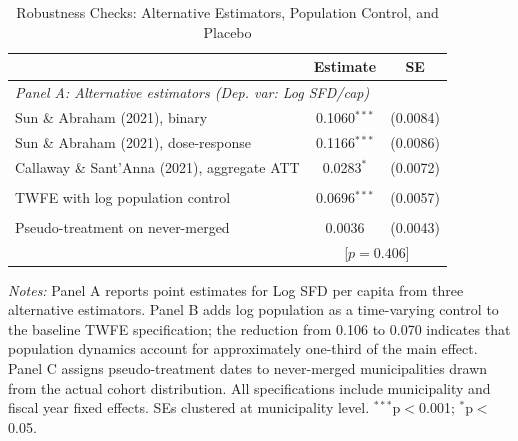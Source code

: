 \begin{table}[htbp]
\centering
\caption{Robustness Checks: Alternative Estimators, Population Control, and Placebo}
\label{tab:robustness}
\begin{tabular}{lcc}
\hline\hline
 & Estimate & SE \\
\hline
\multicolumn{3}{l}{\textit{Panel A: Alternative estimators (Dep. var: Log SFD/cap)}} \\
\addlinespace
Sun \& Abraham (2021), binary & 0.1060$^{***}$ & (0.0084) \\
Sun \& Abraham (2021), dose-response & 0.1166$^{***}$ & (0.0086) \\
Callaway \& Sant'Anna (2021), aggregate ATT & 0.0283$^{*}$ & (0.0072) \\
\addlinespace
\multicolumn{3}{l}{\textit{Panel B: Population control}} \\
\addlinespace
TWFE with log population control & 0.0696$^{***}$ & (0.0057) \\
\addlinespace
\multicolumn{3}{l}{\textit{Panel C: Placebo test}} \\
\addlinespace
Pseudo-treatment on never-merged & 0.0036 & (0.0043) \\
 & \multicolumn{2}{c}{[$p = 0.406$]} \\
\hline\hline
\end{tabular}
\begin{tablenotes}
\item \textit{Notes:} Panel A reports point estimates for Log SFD per capita from three alternative estimators. Panel B adds log population as a time-varying control to the baseline TWFE specification; the reduction from 0.106 to 0.070 indicates that population dynamics account for approximately one-third of the main effect. Panel C assigns pseudo-treatment dates to never-merged municipalities drawn from the actual cohort distribution. All specifications include municipality and fiscal year fixed effects. SEs clustered at municipality level. $^{***}$p$<$0.001; $^{*}$p$<$0.05.
\end{tablenotes}
\end{table}
